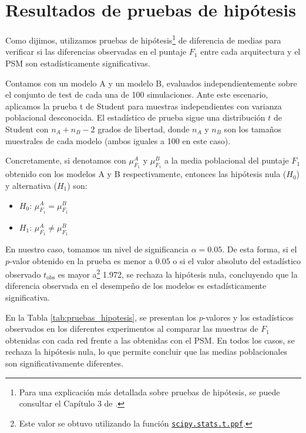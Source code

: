 \documentclass[../main.tex]{subfiles}
\begin{document}
\section*{Resultados de pruebas de hipótesis}
Como dijimos, utilizamos pruebas de hipótesis\footnote{Para una explicación más detallada
sobre pruebas de hipótesis, se puede consultar el Capítulo 3 de \cite{giuliodori-2022}.}
de diferencia de medias para verificar si las diferencias observadas en el puntaje \(F_1\)
entre cada arquitectura y el PSM son estadísticamente significativas.

Contamos con un modelo A y un modelo B, evaluados independientemente sobre el conjunto de
test de cada una de 100 simulaciones. Ante este escenario, aplicamos la prueba t de
Student para muestras independientes con varianza poblacional desconocida. El estadístico
de prueba sigue una distribución \(t\) de Student con \(n_A + n_B - 2\) grados de libertad,
donde \(n_A\) y \(n_B\) son los tamaños muestrales de cada modelo (ambos iguales a 100 en
este caso).

Concretamente, si denotamos con \(\mu^A_{F_1}\) y \(\mu^B_{F_1}\) a la media poblacional
del puntaje \(F_1\) obtenido con los modelos A y B respectivamente, entonces las hipótesis
nula (\(H_0\)) y alternativa (\(H_1\)) son:
\begin{itemize}[itemsep=0.05cm]
    \item \(H_0\): \(\mu^A_{F_1} = \mu^B_{F_1}\)
    \item \(H_1\): \(\mu^A_{F_1} \ne \mu^B_{F_1}\)
\end{itemize}

En nuestro caso, tomamos un nivel de significancia \(\alpha = 0.05\). De esta forma, si el
\(p\)-valor obtenido en la prueba es menor a \(0.05\) o si el valor absoluto del
estadístico observado \(t_{\text{obs}}\) es mayor a\footnote{Este valor se obtuvo
utilizando la función
\href{https://docs.scipy.org/doc/scipy/reference/generated/scipy.stats.t.html}{\texttt{scipy.stats.t.ppf}}.}
1.972, se rechaza la hipótesis nula, concluyendo que la diferencia observada en el
desempeño de los modelos es estadísticamente significativa.

En la Tabla \ref{tab:pruebas_hipotesis}, se presentan los \(p\)-valores y los estadísticos
observados en los diferentes experimentos al comparar las muestras de \(F_1\) obtenidas
con cada red frente a las obtenidas con el PSM. En todos los casos, se rechaza la
hipótesis nula, lo que permite concluir que las medias poblacionales son
significativamente diferentes.
\end{document}
